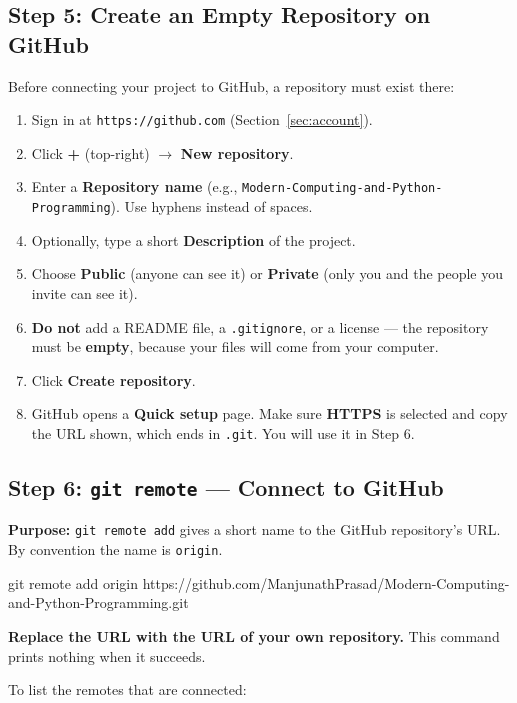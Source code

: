 \documentclass[11pt,a4paper]{article}
\newcommand{\code}[1]{\texttt{#1}}
\newcommand{\menu}[1]{\textsf{\textbf{#1}}}
\begin{document}
\subsection{Step 5: Create an Empty Repository on GitHub}

Before connecting your project to GitHub, a repository must exist there:
\begin{enumerate}
\item Sign in at \code{https://github.com} (Section~\ref{sec:account}).
\item Click \menu{+} (top-right) $\rightarrow$ \menu{New repository}.
\item Enter a \textbf{Repository name} (e.g., \code{Modern-Computing-and-Python-Programming}). Use hyphens instead of spaces.
\item Optionally, type a short \textbf{Description} of the project.
\item Choose \menu{Public} (anyone can see it) or \menu{Private} (only you and the people you invite can see it).
\item \textbf{Do not} add a README file, a \code{.gitignore}, or a license --- the repository must be \textbf{empty}, because your files will come from your computer.
\item Click \menu{Create repository}.
\item GitHub opens a \textbf{Quick setup} page. Make sure \menu{HTTPS} is selected and copy the URL shown, which ends in \code{.git}. You will use it in Step 6.
\end{enumerate}

\subsection{Step 6: \code{git remote} --- Connect to GitHub}

\textbf{Purpose:} \code{git remote add} gives a short name to the GitHub repository's URL. By convention the name is \code{origin}.

\begin{cmd}
git remote add origin https://github.com/ManjunathPrasad/Modern-Computing-and-Python-Programming.git
\end{cmd}

\textbf{Replace the URL with the URL of your own repository.} This command prints nothing when it succeeds.

To list the remotes that are connected:
\end{document}
